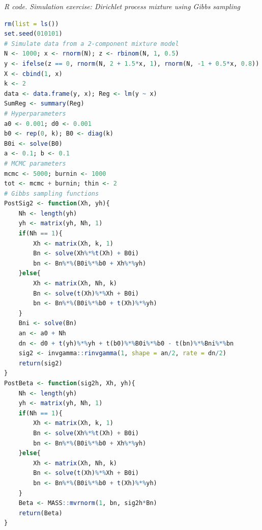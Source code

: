 \begin{tcolorbox}[enhanced,width=4.67in,center upper,
	fontupper=\large\bfseries,drop shadow southwest,sharp corners]
	\textit{R code. Simulation exercise: Dirichlet process mixture using Gibbs sampling}
	\begin{VF}
		\begin{lstlisting}[language=R]
rm(list = ls())
set.seed(010101)
# Simulate data from a 2-component mixture model
N <- 1000; x <- rnorm(N); z <- rbinom(N, 1, 0.5)
y <- ifelse(z == 0, rnorm(N, 2 + 1.5*x, 1), rnorm(N, -1 + 0.5*x, 0.8))
X <- cbind(1, x)
k <- 2
data <- data.frame(y, x); Reg <- lm(y ~ x)
SumReg <- summary(Reg)
# Hyperparameters
a0 <- 0.001; d0 <- 0.001
b0 <- rep(0, k); B0 <- diag(k)
B0i <- solve(B0)
a <- 0.1; b <- 0.1
# MCMC parameters
mcmc <- 5000; burnin <- 1000
tot <- mcmc + burnin; thin <- 2
# Gibbs sampling functions
PostSig2 <- function(Xh, yh){
	Nh <- length(yh)
	yh <- matrix(yh, Nh, 1)
	if(Nh == 1){
		Xh <- matrix(Xh, k, 1)
		Bn <- solve(Xh%*%t(Xh) + B0i)
		bn <- Bn%*%(B0i%*%b0 + Xh%*%yh)
	}else{
		Xh <- matrix(Xh, Nh, k)
		Bn <- solve(t(Xh)%*%Xh + B0i)
		bn <- Bn%*%(B0i%*%b0 + t(Xh)%*%yh)
	}
	Bni <- solve(Bn)
	an <- a0 + Nh
	dn <- d0 + t(yh)%*%yh + t(b0)%*%B0i%*%b0 - t(bn)%*%Bni%*%bn 
	sig2 <- invgamma::rinvgamma(1, shape = an/2, rate = dn/2)
	return(sig2)
}
PostBeta <- function(sig2h, Xh, yh){
	Nh <- length(yh)
	yh <- matrix(yh, Nh, 1)
	if(Nh == 1){
		Xh <- matrix(Xh, k, 1)
		Bn <- solve(Xh%*%t(Xh) + B0i)
		bn <- Bn%*%(B0i%*%b0 + Xh%*%yh)
	}else{
		Xh <- matrix(Xh, Nh, k)
		Bn <- solve(t(Xh)%*%Xh + B0i)
		bn <- Bn%*%(B0i%*%b0 + t(Xh)%*%yh)
	}
	Beta <- MASS::mvrnorm(1, bn, sig2h*Bn)
	return(Beta)
}
\end{lstlisting}
	\end{VF}
\end{tcolorbox}

